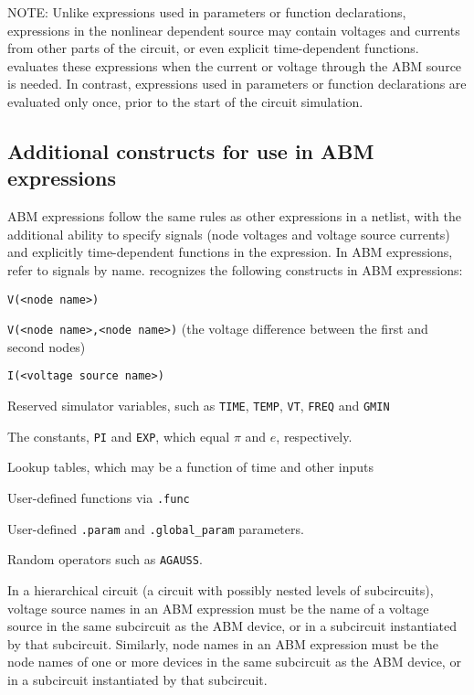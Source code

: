 NOTE: Unlike expressions used in parameters or function declarations,
expressions in the nonlinear dependent source may contain voltages and
currents from other parts of the circuit, or even explicit
time-dependent functions.  \Xyce{} evaluates these expressions when the
current or voltage through the ABM source is needed.  In contrast, expressions
used in parameters or function declarations are evaluated only once, prior
to the start of the circuit simulation.

\subsection{Additional constructs for use in ABM expressions}

ABM expressions follow the same rules as other expressions in a
netlist, with the additional ability to specify signals (node voltages
and voltage source currents) and explicitly time-dependent functions
in the expression.  In ABM expressions, refer to signals by
name. \Xyce{} recognizes the following constructs in ABM expressions:
\begin{XyceItemize}
\item \texttt{V(<node name>)}
\item \texttt{V(<node name>,<node name>)} (the voltage difference between the first and second nodes)
\item \texttt{I(<voltage source name>)}
\item Reserved simulator variables, such as \texttt{TIME}, \texttt{TEMP}, \texttt{VT}, \texttt{FREQ} and \texttt{GMIN}
\item The constants, \texttt{PI} and \texttt{EXP}, which equal $\pi$ and $e$, respectively.
\item Lookup tables, which may be a function of time and other inputs
\item User-defined functions via \texttt{.func}
\item User-defined \texttt{.param} and \texttt{.global\_param} parameters.
\item Random operators such as \texttt{AGAUSS}.
\end{XyceItemize}

In a hierarchical circuit (a circuit with possibly nested levels of
subcircuits), voltage source names in an ABM expression must be the
name of a voltage source in the same subcircuit as the ABM device, or in a
subcircuit instantiated by that subcircuit.  Similarly, node names in an ABM 
expression must be the node names of one or more devices in the same subcircuit
as the ABM device, or in a subcircuit instantiated by that subcircuit. 


